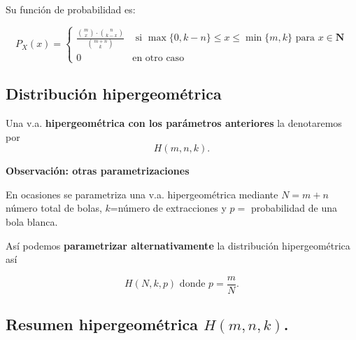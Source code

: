 \documentclass[]{book}
\begin{document}
Su función de probabilidad es:

\[
P_{X}(x)=\left\{
\begin{array}{ll}
\frac{\binom{m}{x}\cdot \binom{n}{k-x}}{\binom{m+n}{k}} & \mbox{ si }
\max\{0,k-n\}\leq x \leq \min\{m,k\} \mbox { para  } x\in \mathbf{N}\\
0  & \mbox{en otro caso}\end{array}\right.
\]

\hypertarget{distribuciuxf3n-hipergeomuxe9trica-1}{%
\subsection{Distribución hipergeométrica}\label{distribuciuxf3n-hipergeomuxe9trica-1}}

Una v.a. \textbf{hipergeométrica con los parámetros anteriores} la
denotaremos por
\[H(m,n,k).\]

 \textbf{Observación: otras parametrizaciones}

En ocasiones se parametriza una v.a. hipergeométrica mediante \(N=m+n\) número total de bolas,
\(k\)=número de extracciones y \(p=\) probabilidad de una bola blanca.

Así podemos \textbf{parametrizar alternativamente} la distribución hipergeométrica así

\[H(N,k,p)\mbox{ donde } p=\frac{m}{N}.\]

\hypertarget{resumen-hipergeomuxe9trica-hmnk.}{%
\subsection{\texorpdfstring{Resumen hipergeométrica \(H(m,n,k)\).}{Resumen hipergeométrica H(m,n,k).}}\label{resumen-hipergeomuxe9trica-hmnk.}}
\end{document}
